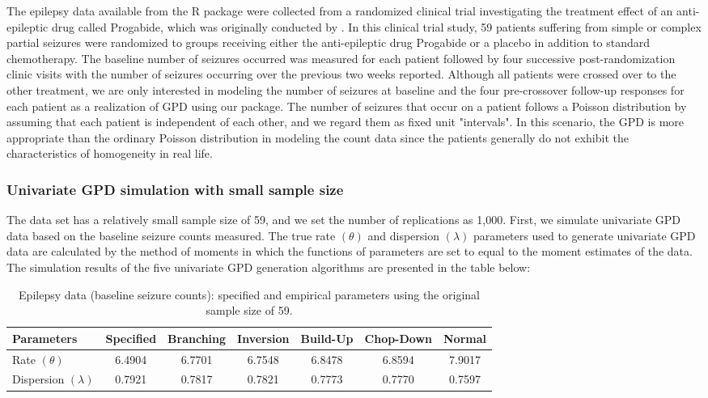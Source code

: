 The epilepsy data \citep{thall1990some} available from the R package  \citep{robustbase2020} were collected from a randomized clinical trial investigating the treatment effect of an anti-epileptic drug called Progabide, which was originally conducted by \cite{Leppik1985}. In this clinical trial study, 59 patients suffering from simple or complex partial seizures were randomized to groups receiving either
the anti-epileptic drug Progabide or a placebo in addition to standard chemotherapy. The baseline number of seizures occurred was measured for each patient followed by four successive post-randomization clinic visits with the number of seizures occurring over the previous two weeks reported. Although all patients were crossed over to the other treatment, we are only interested in modeling the number of seizures at baseline and the four pre-crossover follow-up responses for each patient as a realization of GPD using our package. The number of seizures that occur on a patient follows a Poisson distribution by assuming that each patient is independent of each other, and we regard them as fixed unit "intervals". In this scenario, the GPD is more appropriate than the ordinary Poisson distribution in modeling the count data since the patients generally do not exhibit the characteristics of homogeneity in real life. 

\subsubsection{Univariate GPD simulation with small sample size}

The data set has a relatively small sample size of 59, and we set the number of replications as 1,000. First, we simulate univariate GPD data based on the baseline seizure counts measured. The true rate $(\theta)$ and dispersion $(\lambda)$ parameters used to generate univariate GPD data are calculated by the method of moments in which the functions of parameters are set to equal to the moment estimates of the data. The simulation results of the five univariate GPD generation algorithms are presented in the table below:

\begin{table}[ht]
\caption{Epilepsy data (baseline seizure counts): specified and empirical parameters using the original sample size of 59.} 
\centering 
\begin{tabularx}{1.0\linewidth}{lcccccc}
\toprule
Parameters & Specified & Branching & Inversion & Build-Up & Chop-Down & Normal\\ [0.5ex] 
\midrule
Rate $(\theta)$        & 6.4904 & 6.7701 & 6.7548 & 6.8478 & 6.8594 & 7.9017 \\
Dispersion $(\lambda)$ & 0.7921 & 0.7817 & 0.7821 & 0.7773 & 0.7770 & 0.7597 \\
\bottomrule
\end{tabularx}
\label{t-3e}
\end{table}

